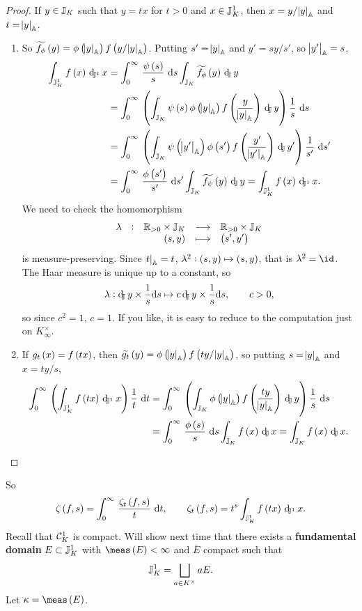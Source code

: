 \begin{proof}
If $ y \in \mathbb{J}_K $ such that $ y = tx $ for $ t > 0 $ and $ x \in \mathbb{J}_K^1 $, then $ x = y / \abs{y}_{\mathbb{A}} $ and $ t = \abs{y}_{\mathbb{A}} $.
\begin{enumerate}
\item So $ \widetilde{f_\phi}\br{y} = \phi\br{\abs{y}_\AA}f\br{y / \abs{y}_\AA} $. Putting $ s' = \abs{y}_{\mathbb{A}} $ and $ y' = sy / s' $, so $ \abs{y'}_{\mathbb{A}} = s $,
\begin{align*}
\intJI{f\br{x}}{x}
& = \intd{0}{\infty}{\dfrac{\psi\br{s}}{s}}{s}\intJ{\widetilde{f_\phi}\br{y}}{y} \\
& = \intd{0}{\infty}{\br{\intJ{\psi\br{s}\phi\br{\abs{y}_\AA}f\br{\dfrac{y}{\abs{y}_\AA}}}{y}}\dfrac{1}{s}}{s} \\
& = \intd{0}{\infty}{\br{\intJ{\psi\br{\abs{y'}_\AA}\phi\br{s'}f\br{\dfrac{y'}{\abs{y'}_\AA}}}{y'}}\dfrac{1}{s'}}{s'} \\
& = \intd{0}{\infty}{\dfrac{\phi\br{s'}}{s'}}{s'}\intJ{\widetilde{f_\psi}\br{y}}{y}
= \intJI{f\br{x}}{x}.
\end{align*}
We need to check the homomorphism
$$ \function[\lambda]{\RR_{> 0} \times \JJ_K}{\RR_{> 0} \times \JJ_K}{\br{s, y}}{\br{s', y'}} $$
is measure-preserving. Since $ \abs{t}_{\mathbb{A}} = t $, $ \lambda^2 : \br{s, y} \mapsto \br{s, y} $, that is $ \lambda^2 = \id $. The Haar measure is unique up to a constant, so
$$ \lambda : \dJ y \times \dfrac{1}{s}\d s \mapsto c\dJ y \times \dfrac{1}{s}\d s, \qquad c > 0, $$
so since $ c^2 = 1 $, $ c = 1 $. If you like, it is easy to reduce to the computation just on $ K_\infty^\times $.
\item If $ g_t\br{x} = f\br{tx} $, then $ \widetilde{g_t}\br{y} = \phi\br{\abs{y}_\AA}f\br{ty / \abs{y}_\AA} $, so putting $ s = \abs{y}_{\mathbb{A}} $ and $ x = ty / s $,
\begin{align*}
\intd{0}{\infty}{\br{\intJI{f\br{tx}}{x}}\dfrac{1}{t}}{t}
& = \intd{0}{\infty}{\br{\intJ{\phi\br{\abs{y}_\AA}f\br{\dfrac{ty}{\abs{y}_\AA}}}{y}}\dfrac{1}{s}}{s} \\
& = \intd{0}{\infty}{\dfrac{\phi\br{s}}{s}}{s}\intJ{f\br{x}}{x}
= \intJ{f\br{x}}{x}.
\end{align*}
\end{enumerate}
\end{proof}

So
$$ \zeta\br{f, s} = \intd{0}{\infty}{\dfrac{\zeta_t\br{f, s}}{t}}{t}, \qquad \zeta_t\br{f, s} = t^s\intJI{f\br{tx}}{x}. $$
Recall that $ \mathcal{C}_K^1 $ is compact. Will show next time that there exists a \textbf{fundamental domain} $ E \subset \mathbb{J}_K^1 $ with $ \meas\br{E} < \infty $ and $ \overline{E} $ compact such that
$$ \mathbb{J}_K^1 = \bigsqcup_{a \in K^\times} aE. $$
Let $ \kappa = \meas\br{E} $.


